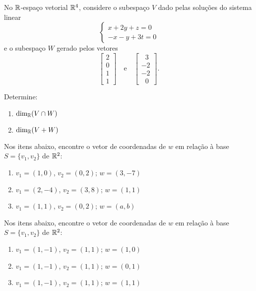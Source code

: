 \documentclass[12pt]{exam}
\begin{document}
    \begin{exercicio}
        No $\mathbb{R}$-espaço vetorial $\mathbb{R}^4$, considere o subespaço $V$ dado pelas soluç\~oes do sistema linear
        \[
            \begin{cases}
                x + 2y + z = 0\\
                -x -y + 3t = 0
            \end{cases}
        \]
        e o subespaço $W$ gerado pelos vetores
        \[
            \begin{bmatrix}
                2\\
                0\\
                1\\
                1
            \end{bmatrix} \quad \mbox{e}\quad
            \begin{bmatrix}
                \phantom{x} 3\\
                -2\\
                -2\\
                \phantom{x} 0
            \end{bmatrix}.
        \]

        Determine:
        \begin{enumerate}[label={\alph*})]
            \item $\dim_{\mathbb{R}}(V \cap W)$

            \item $\dim_{\mathbb{R}}(V + W)$
        \end{enumerate}
    \end{exercicio}

        \begin{exercicio}
        Nos itens abaixo, encontre o vetor de coordenadas de $w$ em relação à base  $S = \{v_1, v_2\}$ de $\mathbb{R}^2$:
        \begin{enumerate}[label={\alph*})]
            \item $v_1 = (1, 0)$, $v_2 = (0, 2)$; $w = (3, -7)$
            \item $v_1 = (2, -4)$, $v_2 = (3, 8)$; $w = (1, 1)$
            \item $v_1 = (1, 1)$, $v_2 = (0, 2)$; $w = (a, b)$
        \end{enumerate}
    \end{exercicio}

    \begin{exercicio}
        Nos itens abaixo, encontre o vetor de coordenadas de $w$ em relação à base $S = \{v_1, v_2\}$ de $\mathbb{R}^2$:
        \begin{enumerate}[label={\alph*})]
            \item $v_1 = (1, -1)$, $v_2 = (1, 1)$; $w = (1, 0)$
            \item $v_1 = (1, -1)$, $v_2 = (1, 1)$; $w = (0, 1)$
            \item $v_1 = (1, -1)$, $v_2 = (1, 1)$; $w = (1, 1)$
        \end{enumerate}
    \end{exercicio}
\end{document}
